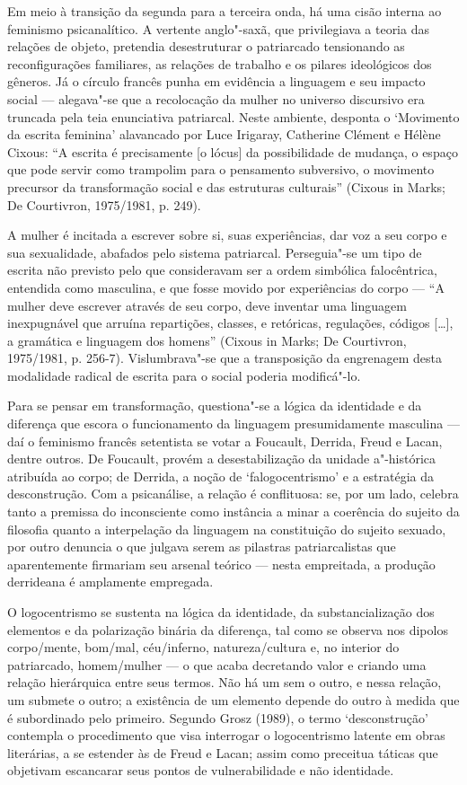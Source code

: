 Em meio à transição da segunda para a terceira onda, há uma cisão
interna ao feminismo psicanalítico. A vertente anglo"-saxã, que
privilegiava a teoria das relações de objeto, pretendia desestruturar o
patriarcado tensionando as reconfigurações familiares, as relações de
trabalho e os pilares ideológicos dos gêneros. Já o círculo francês
punha em evidência a linguagem e seu impacto social --- alegava"-se que a
recolocação da mulher no universo discursivo era truncada pela teia
enunciativa patriarcal. Neste ambiente, desponta o `Movimento da escrita
feminina' alavancado por Luce Irigaray, Catherine Clément e Hélène
Cixous: ``A escrita é precisamente {[}o lócus{]} da possibilidade de
mudança, o espaço que pode servir como trampolim para o pensamento
subversivo, o movimento precursor da transformação social e das
estruturas culturais'' (Cixous in Marks; De Courtivron, 1975/1981, p.
249).

A mulher é incitada a escrever sobre si, suas experiências, dar voz a
seu corpo e sua sexualidade, abafados pelo sistema patriarcal.
Perseguia"-se um tipo de escrita não previsto pelo que consideravam ser a
ordem simbólica falocêntrica, entendida como masculina, e que fosse
movido por experiências do corpo --- ``A mulher deve escrever através de
seu corpo, deve inventar uma linguagem inexpugnável que arruína
repartições, classes, e retóricas, regulações, códigos {[}\ldots{}{]}, a
gramática e linguagem dos homens'' (Cixous in Marks; De Courtivron,
1975/1981, p. 256-7). Vislumbrava"-se que a transposição da engrenagem
desta modalidade radical de escrita para o social poderia modificá"-lo.

Para se pensar em transformação, questiona"-se a lógica da identidade e
da diferença que escora o funcionamento da linguagem presumidamente
masculina --- daí o feminismo francês setentista se votar a Foucault,
Derrida, Freud e Lacan, dentre outros. De Foucault, provém a
desestabilização da unidade a"-histórica atribuída ao corpo; de Derrida,
a noção de `falogocentrismo' e a estratégia da desconstrução. Com a
psicanálise, a relação é conflituosa: se, por um lado, celebra tanto a
premissa do inconsciente como instância a minar a coerência do sujeito
da filosofia quanto a interpelação da linguagem na constituição do
sujeito sexuado, por outro denuncia o que julgava serem as pilastras
patriarcalistas que aparentemente firmariam seu arsenal teórico --- nesta
empreitada, a produção derrideana é amplamente empregada.

O logocentrismo se sustenta na lógica da identidade, da
substancialização dos elementos e da polarização binária da diferença,
tal como se observa nos dipolos corpo/mente, bom/mal, céu/inferno,
natureza/cultura e, no interior do patriarcado, homem/mulher --- o que
acaba decretando valor e criando uma relação hierárquica entre seus
termos. Não há um sem o outro, e nessa relação, um submete o outro; a
existência de um elemento depende do outro à medida que é subordinado
pelo primeiro. Segundo Grosz (1989), o termo `desconstrução' contempla o
procedimento que visa interrogar o logocentrismo latente em obras
literárias, a se estender às de Freud e Lacan; assim como preceitua
táticas que objetivam escancarar seus pontos de vulnerabilidade e não
identidade.

